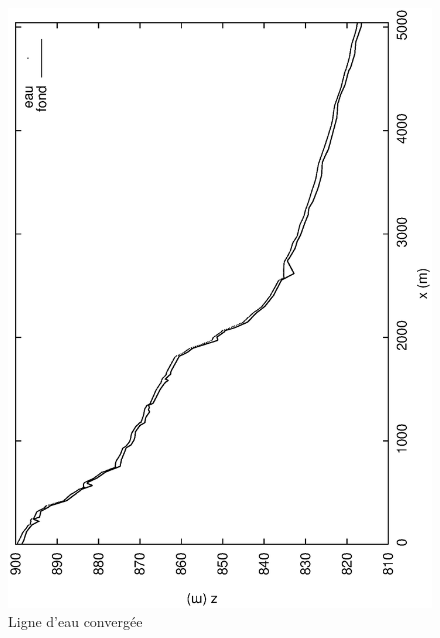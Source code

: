 \documentclass[a4paper,10pt]{article}
\begin{document}
\begin{figure}
 \begin{center}
  \includegraphics[angle=270,width=15cm]{Zconv.eps}
  \caption{Ligne d'eau convergée}
  \label{fig2}
 \end{center}
\end{figure}
\end{document}
